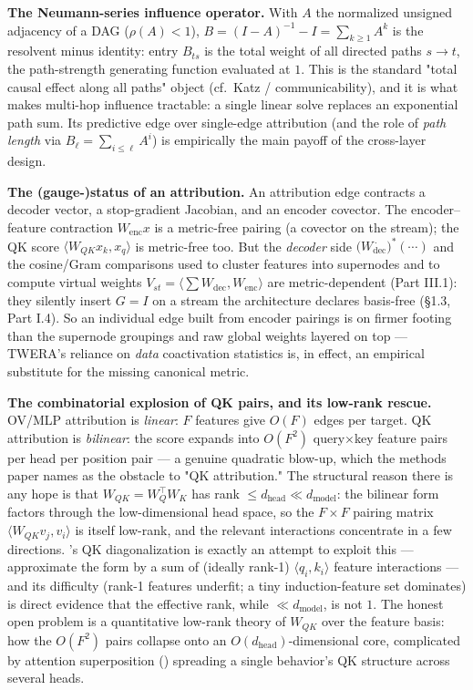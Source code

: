 \textbf{The Neumann-series influence operator.} With $A$ the normalized unsigned adjacency of a DAG ($\rho(A)<1$), $B=(I-A)^{-1}-I=\sum_{k\ge1}A^k$ is the resolvent minus identity: entry $B_{ts}$ is the total weight of all directed paths $s\to t$, the path-strength generating function evaluated at $1$. This is the standard "total causal effect along all paths" object (cf.\ Katz / communicability), and it is what makes multi-hop influence tractable: a single linear solve replaces an exponential path sum. Its predictive edge over single-edge attribution (and the role of \emph{path length} via $B_\ell=\sum_{i\le\ell}A^i$) is empirically the main payoff of the cross-layer design.

\textbf{The (gauge-)status of an attribution.} An attribution edge contracts a decoder vector, a stop-gradient Jacobian, and an encoder covector. The encoder--feature contraction $W_{\text{enc}}x$ is a metric-free pairing (a covector on the stream); the QK score $\langle W_{QK}x_k,x_q\rangle$ is metric-free too. But the \emph{decoder} side $\big(W_{\text{dec}}^{\,\cdot}\big)^{*}(\cdots)$ and the cosine/Gram comparisons used to cluster features into supernodes and to compute virtual weights $V_{st}=\langle\sum W_{\text{dec}},W_{\text{enc}}\rangle$ are metric-dependent (Part III.1): they silently insert $G=I$ on a stream the architecture declares basis-free (§1.3, Part I.4). So an individual edge built from encoder pairings is on firmer footing than the supernode groupings and raw global weights layered on top --- TWERA's reliance on \emph{data} coactivation statistics is, in effect, an empirical substitute for the missing canonical metric.

\textbf{The combinatorial explosion of QK pairs, and its low-rank rescue.} OV/MLP attribution is \emph{linear}: $F$ features give $O(F)$ edges per target. QK attribution is \emph{bilinear}: the score expands into $O(F^2)$ query$\times$key feature pairs per head per position pair --- a genuine quadratic blow-up, which the methods paper names as the obstacle to "QK attribution." The structural reason there is any hope is that $W_{QK}=W_Q^{\top}W_K$ has rank $\le d_{\text{head}}\ll d_{\text{model}}$: the bilinear form factors through the low-dimensional head space, so the $F\times F$ pairing matrix $\langle W_{QK}v_j,v_i\rangle$ is itself low-rank, and the relevant interactions concentrate in a few directions. \textcite{progress-on-attention}'s QK diagonalization is exactly an attempt to exploit this --- approximate the form by a sum of (ideally rank-1) $\langle q_i,k_i\rangle$ feature interactions --- and its difficulty (rank-1 features underfit; a tiny induction-feature set dominates) is direct evidence that the effective rank, while $\ll d_{\text{model}}$, is not $1$. The honest open problem is a quantitative low-rank theory of $W_{QK}$ over the feature basis: how the $O(F^2)$ pairs collapse onto an $O(d_{\text{head}})$-dimensional core, complicated by attention superposition (\textcite{progress-on-attention}) spreading a single behavior's QK structure across several heads.


\printbibliography

